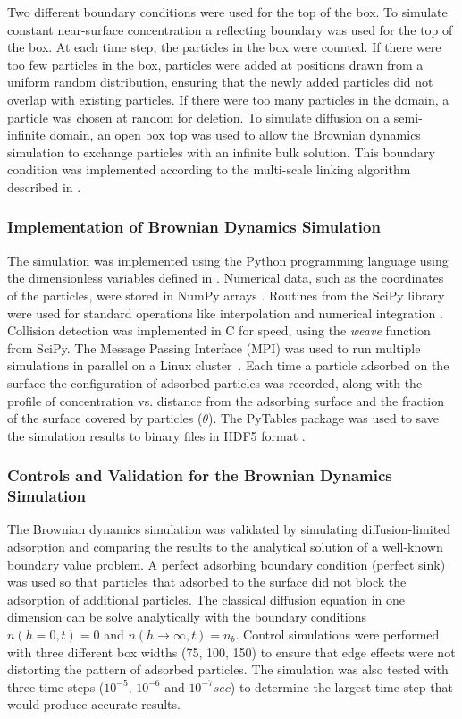 Two different boundary conditions were used for the top of the box.
To simulate constant near-surface concentration a reflecting boundary
was used for the top of the box. At each time step, the particles
in the box were counted. If there were too few particles in the box,
particles were added at positions drawn from a uniform random distribution,
ensuring that the newly added particles did not overlap with existing
particles. If there were too many particles in the domain, a particle
was chosen at random for deletion. To simulate diffusion on a semi-infinite
domain, an open box top was used to allow the Brownian dynamics simulation
to exchange particles with an infinite bulk solution. This boundary
condition was implemented according to the multi-scale linking algorithm
described in \cite{Magan2004}. 


\subsubsection{Implementation of Brownian Dynamics Simulation}

The simulation was implemented using the Python programming language
using the dimensionless variables defined in \cite{Magan2004}. Numerical
data, such as the coordinates of the particles, were stored in NumPy
arrays \cite{Oliphant2006}. Routines from the SciPy library were
used for standard operations like interpolation and numerical integration
\cite{Oliphant2007}. Collision detection was implemented in C for
speed, using the \emph{weave} function from SciPy. The Message Passing
Interface (MPI) was used to run multiple simulations in parallel on
a Linux cluster~\cite{MPI}. Each time a particle adsorbed on the
surface the configuration of adsorbed particles was recorded, along
with the profile of concentration vs. distance from the adsorbing
surface and the fraction of the surface covered by particles ($\theta$).
The PyTables package was used to save the simulation results to binary
files in HDF5 format \cite{Alted2002-,HDFGroup2000-}. 


\subsubsection{Controls and Validation for the Brownian Dynamics Simulation}

The Brownian dynamics simulation was validated by simulating diffusion-limited
adsorption and comparing the results to the analytical solution of
a well-known boundary value problem. A perfect adsorbing boundary
condition (perfect sink) was used so that particles that adsorbed
to the surface did not block the adsorption of additional particles.
The classical diffusion equation in one dimension can be solve analytically
with the boundary conditions $n(h=0,t)=0$ and $n(h\rightarrow\infty,t)=n_{b}$.
Control simulations were performed with three different box widths
(75, 100, 150) to ensure that edge effects were not distorting the
pattern of adsorbed particles. The simulation was also tested with
three time steps ($10^{-5}$, $10^{-6}$ and $10^{-7}sec$) to determine
the largest time step that would produce accurate results.


